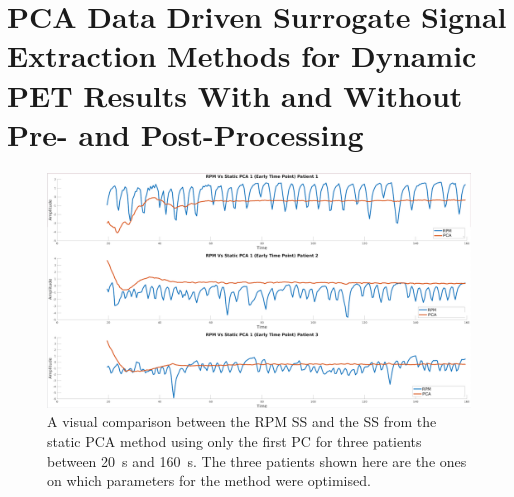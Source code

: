\chapter{PCA Data Driven Surrogate Signal Extraction Methods for Dynamic PET Results With and Without Pre- and Post-Processing} \label{sec:pca_data_driven_surrogate_signal_extraction_methods_for_dynamic_pet_results_with_and_without_pre_and_post_processing_appendix}
    \newpage

    \begin{figure}
        \centering
        
        \includegraphics[width=1.0\linewidth]{figures/data_driven_surrogate_signal_extraction_results_1_vanilla_surrogate_signal.png}
        
        \captionsetup{singlelinecheck=false}
        \caption{
            A visual comparison between the \gls{RPM} \gls{SS} and the \gls{SS} from the static \gls{PCA} method using only the first \gls{PC} for three patients between \SI{20}{\second} and \SI{160}{\second}. The three patients shown here are the ones on which parameters for the method were optimised.
        }
        \label{fig:pca_data_driven_surrogate_signal_extraction_methods_for_dynamic_pet_results_with_and_without_pre_and_post_processing_appendix_vanilla_surrogate_signal}
    \end{figure}
    
